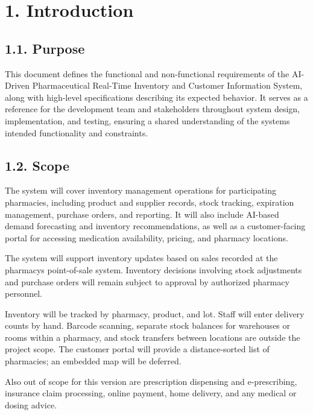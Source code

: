 \clearpage
\tableofcontents

\clearpage
\section{1. Introduction}\label{introduction}

\subsection{1.1. Purpose}\label{purpose}

This document defines the functional and non-functional requirements of the AI-Driven Pharmaceutical Real-Time Inventory and Customer Information System, along with high-level specifications describing its expected behavior. It serves as a reference for the development team and stakeholders throughout system design, implementation, and testing, ensuring a shared understanding of the system\textquotesingle s intended functionality and constraints.

\subsection{1.2. Scope}\label{scope}

The system will cover inventory management operations for participating pharmacies, including product and supplier records, stock tracking, expiration management, purchase orders, and reporting. It will also include AI-based demand forecasting and inventory recommendations, as well as a customer-facing portal for accessing medication availability, pricing, and pharmacy locations.

The system will support inventory updates based on sales recorded at the pharmacy\textquotesingle s point-of-sale system. Inventory decisions involving stock adjustments and purchase orders will remain subject to approval by authorized pharmacy personnel.

Inventory will be tracked by pharmacy, product, and lot. Staff will enter delivery counts by hand. Barcode scanning, separate stock balances for warehouses or rooms within a pharmacy, and stock transfers between locations are outside the project scope. The customer portal will provide a distance-sorted list of pharmacies; an embedded map will be deferred.

Also out of scope for this version are prescription dispensing and e-prescribing, insurance claim processing, online payment, home delivery, and any medical or dosing advice.

